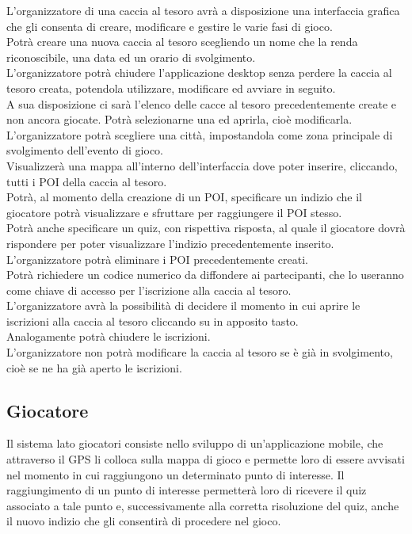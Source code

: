 \documentclass[12pt, english]{report}
\begin{document}
L’organizzatore di una caccia al tesoro avrà a disposizione una interfaccia grafica che gli consenta di creare, modificare e gestire le varie fasi di gioco.\\
Potrà creare una nuova caccia al tesoro scegliendo un nome che la renda riconoscibile, una data ed un orario di svolgimento.\\
L’organizzatore potrà chiudere l’applicazione desktop senza perdere la caccia al tesoro creata, potendola utilizzare, modificare ed avviare in seguito.\\
A sua disposizione ci sarà l’elenco delle cacce al tesoro precedentemente create e non ancora giocate. Potrà selezionarne una ed aprirla, cioè modificarla.\\
L’organizzatore potrà scegliere una città, impostandola come zona principale di svolgimento dell’evento di gioco.\\
Visualizzerà una mappa all’interno dell’interfaccia dove poter inserire, cliccando, tutti i POI della caccia al tesoro.\\
Potrà, al momento della creazione di un POI, specificare un indizio che il giocatore potrà visualizzare e sfruttare per raggiungere il POI stesso.\\
Potrà anche specificare un quiz, con rispettiva risposta, al quale il giocatore dovrà rispondere per poter visualizzare l’indizio precedentemente inserito.\\
L’organizzatore potrà eliminare i POI precedentemente creati.\\
Potrà richiedere un codice numerico da diffondere ai partecipanti, che lo useranno come chiave di accesso per l’iscrizione alla caccia al tesoro.\\
L’organizzatore avrà la possibilità di decidere il momento in cui aprire le iscrizioni alla caccia al tesoro cliccando su in apposito tasto.\\
Analogamente potrà chiudere le iscrizioni.\\
L’organizzatore non potrà modificare la caccia al tesoro se è già in svolgimento, cioè se ne ha già aperto le iscrizioni.\\


\subsection*{Giocatore}
Il sistema lato giocatori consiste nello sviluppo di un'applicazione mobile, che attraverso il GPS li colloca sulla mappa di gioco e permette loro di essere avvisati nel momento in cui raggiungono un determinato punto di interesse. Il raggiungimento di un punto di interesse permetterà loro di ricevere il quiz associato a tale punto e, successivamente alla corretta risoluzione del quiz, anche il nuovo indizio che gli consentirà di procedere nel gioco.
\end{document}
